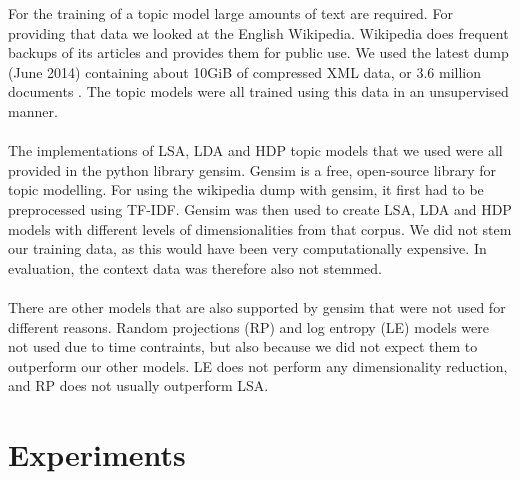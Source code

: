 For the training of a topic model large amounts of text are required. For providing that data we looked at the English Wikipedia. Wikipedia does frequent backups of its articles and provides them for public use. We used the latest dump (June 2014) containing about 10GiB of compressed XML data, or 3.6 million documents \cite{wikidumps}. The topic models were all trained using this data in an unsupervised manner.\\\\
The implementations of LSA, LDA and HDP topic models that we used were all provided in the python library gensim. Gensim is a free, open-source library for topic modelling. For using the wikipedia dump with gensim, it first had to be preprocessed using TF-IDF. Gensim was then used to create LSA, LDA and HDP models with different levels of dimensionalities from that corpus. We did not stem our training data, as this would have been very computationally expensive. In evaluation, the context data was therefore also not stemmed.\\\\
There are other models that are also supported by gensim that were not used for different reasons. Random projections (RP) \cite{gensimRP} and log entropy (LE) \cite{gensimLE} models were not used due to time contraints, but also because we did not expect them to outperform our other models. LE does not perform any dimensionality reduction, and RP does not usually outperform LSA. 


\thispagestyle{plain}


\section{Experiments}
